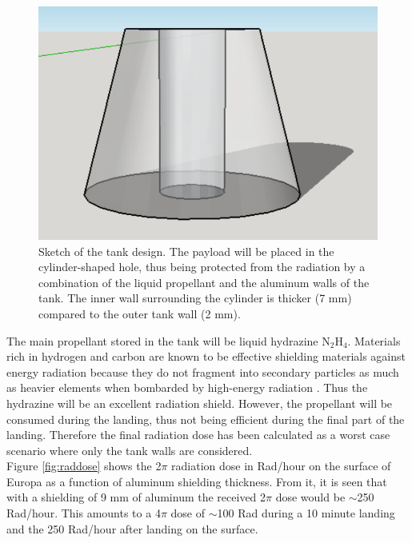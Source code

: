 \begin{figure}[htb]
\begin{center}
\includegraphics[scale=0.7]{figures/navtheory/tank}
\caption{Sketch of the tank design. The payload will be placed in the cylinder-shaped hole, thus being protected from the radiation by a combination of the liquid propellant and the aluminum walls of the tank. The inner wall surrounding the cylinder is thicker (7 mm) compared to the outer tank wall (2 mm). }
\label{fig:tankdesign}
\end{center}
\end{figure}

The main propellant stored in the tank will be liquid hydrazine N$_2$H$_4$. Materials rich in hydrogen and carbon are known to be effective shielding materials against energy radiation because they do not fragment into secondary particles as much as heavier elements when bombarded by high-energy radiation \cite{rad_shield_2006}. Thus the hydrazine will be an excellent radiation shield. 
However, the propellant will be consumed during the landing, thus not being efficient during the final part of the landing. Therefore the final radiation dose has been calculated as a worst case scenario where only the tank walls are considered. \\

Figure \ref{fig:raddose} shows the 2$\pi$ radiation dose in Rad/hour on the surface of Europa as a function of aluminum shielding thickness. From it, it is seen that with a shielding of 9 mm of aluminum the received 2$\pi$ dose would be $\sim$250 Rad/hour. This amounts to a 4$\pi$ dose of $\sim$100 Rad during a 10 minute landing and the 250 Rad/hour after landing on the surface.

